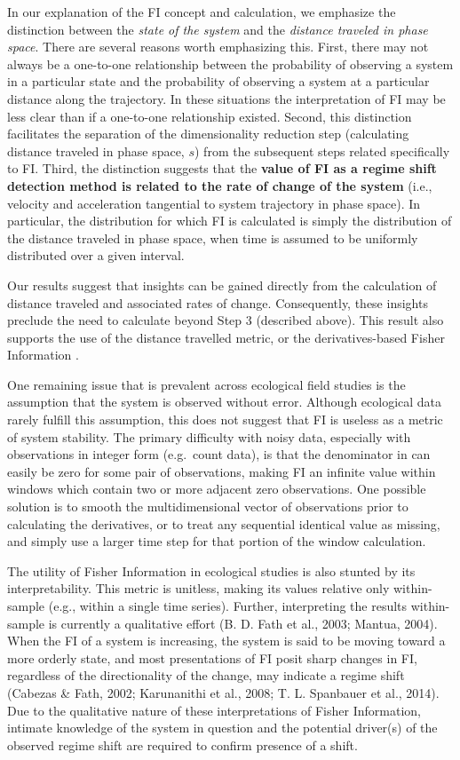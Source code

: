 \documentclass[12pt,twoside,openany]{reedthesis}
\begin{document}
In our explanation of the FI concept and calculation, we emphasize the
distinction between the \emph{state of the system} and the
\emph{distance traveled in phase space}. There are several reasons worth
emphasizing this. First, there may not always be a one-to-one
relationship between the probability of observing a system in a
particular state and the probability of observing a system at a
particular distance along the trajectory. In these situations the
interpretation of FI may be less clear than if a one-to-one relationship
existed. Second, this distinction facilitates the separation of the
dimensionality reduction step (calculating distance traveled in phase
space, \(s\)) from the subsequent steps related specifically to FI.
Third, the distinction suggests that the \textbf{value of FI as a regime
shift detection method is related to the rate of change of the system}
(i.e., velocity and acceleration tangential to system trajectory in
phase space). In particular, the distribution for which FI is calculated
is simply the distribution of the distance traveled in phase space, when
time is assumed to be uniformly distributed over a given interval.

Our results suggest that insights can be gained directly from the
calculation of distance traveled and associated rates of change.
Consequently, these insights preclude the need to calculate beyond Step
3 (described above). This result also supports the use of the distance
travelled metric, or the derivatives-based Fisher Information
\label{eq:fiDerivs}.

One remaining issue that is prevalent across ecological field studies is
the assumption that the system is observed without error. Although
ecological data rarely fulfill this assumption, this does not suggest
that FI is useless as a metric of system stability. The primary
difficulty with noisy data, especially with observations in integer form
(e.g.~count data), is that the denominator in can easily be zero for
some pair of observations, making FI an infinite value within windows
which contain two or more adjacent zero observations. One possible
solution is to smooth the multidimensional vector of observations prior
to calculating the derivatives, or to treat any sequential identical
value as missing, and simply use a larger time step for that portion of
the window calculation.

The utility of Fisher Information in ecological studies is also stunted
by its interpretability. This metric is unitless, making its values
relative only within-sample (e.g., within a single time series).
Further, interpreting the results within-sample is currently a
qualitative effort (B. D. Fath et al., 2003; Mantua, 2004). When the FI
of a system is increasing, the system is said to be moving toward a more
orderly state, and most presentations of FI posit sharp changes in FI,
regardless of the directionality of the change, may indicate a regime
shift (Cabezas \& Fath, 2002; Karunanithi et al., 2008; T. L. Spanbauer
et al., 2014). Due to the qualitative nature of these interpretations of
Fisher Information, intimate knowledge of the system in question and the
potential driver(s) of the observed regime shift are required to confirm
presence of a shift.
\end{document}
